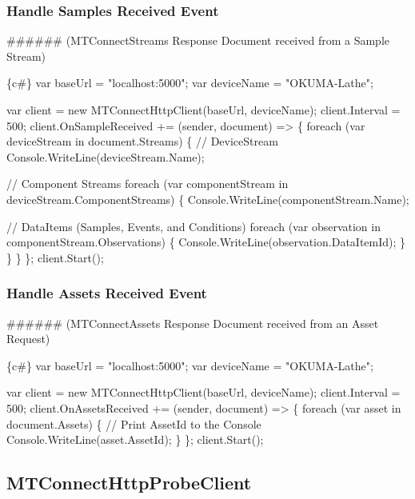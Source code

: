 \subsubsection*{Handle Samples Received Event}

\#\#\#\#\#\# (M\+T\+Connect\+Streams Response Document received from a Sample Stream) 
\begin{DoxyCode}
\{c#\}
var baseUrl = "localhost:5000";
var deviceName = "OKUMA-Lathe";

var client = new MTConnectHttpClient(baseUrl, deviceName);
client.Interval = 500;
client.OnSampleReceived += (sender, document) =>
\{
    foreach (var deviceStream in document.Streams)
    \{
        // DeviceStream
        Console.WriteLine(deviceStream.Name);

        // Component Streams
        foreach (var componentStream in deviceStream.ComponentStreams)
        \{
            Console.WriteLine(componentStream.Name);

            // DataItems (Samples, Events, and Conditions)
            foreach (var observation in componentStream.Observations)
            \{
                Console.WriteLine(observation.DataItemId);
            \}
        \}
    \}
\};
client.Start();
\end{DoxyCode}


\subsubsection*{Handle Assets Received Event}

\#\#\#\#\#\# (M\+T\+Connect\+Assets Response Document received from an Asset Request) 
\begin{DoxyCode}
\{c#\}
var baseUrl = "localhost:5000";
var deviceName = "OKUMA-Lathe";

var client = new MTConnectHttpClient(baseUrl, deviceName);
client.Interval = 500;
client.OnAssetsReceived += (sender, document) =>
\{
    foreach (var asset in document.Assets)
    \{
        // Print AssetId to the Console
        Console.WriteLine(asset.AssetId);
    \}
\};
client.Start();
\end{DoxyCode}


\subsection*{M\+T\+Connect\+Http\+Probe\+Client}

